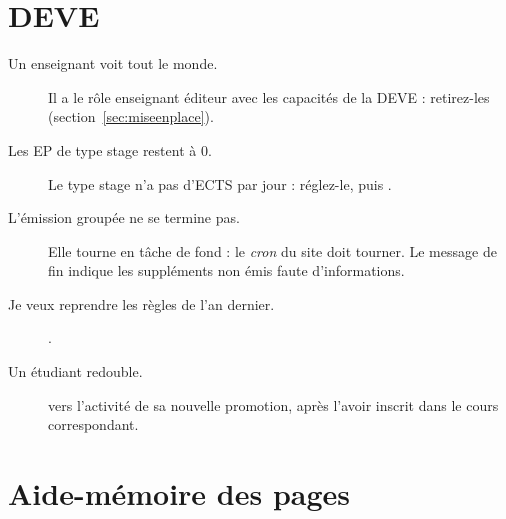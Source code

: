 \documentclass[11pt,a4paper]{article}
\begin{document}
\section{DEVE}

\begin{description}
  \item[Un enseignant voit tout le monde.] Il a le rôle \og enseignant éditeur\fg{} avec les
    capacités de la DEVE : retirez-les (section~\ref{sec:miseenplace}).
  \item[Les EP de type stage restent à 0.] Le type stage n'a pas d'ECTS par jour : réglez-le,
    puis .
  \item[L'émission groupée ne se termine pas.] Elle tourne en tâche de fond : le \emph{cron}
    du site doit tourner. Le message de fin indique les suppléments non émis faute
    d'informations.
  \item[Je veux reprendre les règles de l'an dernier.] .
  \item[Un étudiant redouble.]  vers l'activité de sa
    nouvelle promotion, après l'avoir inscrit dans le cours correspondant.
\end{description}

\appendix
\section{Aide-mémoire des pages}
\end{document}
